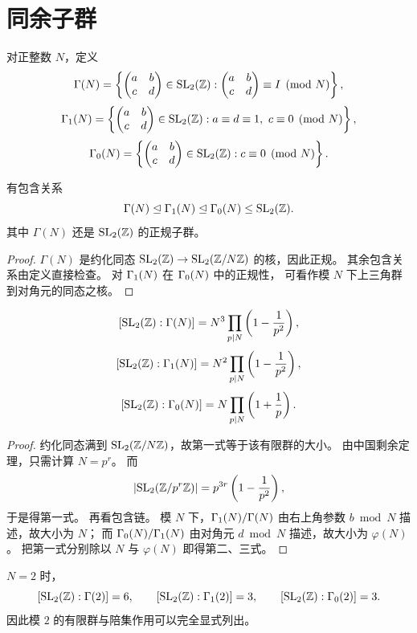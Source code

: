 \section{同余子群}
\begin{definition}
对正整数 $N$，定义
\[
\Gamma(N)=\left\{\begin{pmatrix} a&b\\c&d \end{pmatrix}\in\mathrm{SL}_2(\mathbb{Z}):
\begin{pmatrix} a&b\\c&d \end{pmatrix}\equiv I\pmod N\right\},
\]
\[
\Gamma_1(N)=\left\{\begin{pmatrix} a&b\\c&d \end{pmatrix}\in\mathrm{SL}_2(\mathbb{Z}):a\equiv d\equiv1,\ c\equiv0\pmod N\right\},
\]
\[
\Gamma_0(N)=\left\{\begin{pmatrix} a&b\\c&d \end{pmatrix}\in\mathrm{SL}_2(\mathbb{Z}):c\equiv0\pmod N\right\}.
\]
\end{definition}
\begin{proposition}
有包含关系
\[
\Gamma(N)\trianglelefteq \Gamma_1(N)\trianglelefteq \Gamma_0(N)\le \mathrm{SL}_2(\mathbb{Z}).
\]
其中 $\Gamma(N)$ 还是 $\mathrm{SL}_2(\mathbb{Z})$ 的正规子群。
\end{proposition}
\begin{proof}
$\Gamma(N)$ 是约化同态 $\mathrm{SL}_2(\mathbb{Z})\to \mathrm{SL}_2(\mathbb{Z}/N\mathbb{Z})$ 的核，因此正规。
其余包含关系由定义直接检查。
对 $\Gamma_1(N)$ 在 $\Gamma_0(N)$ 中的正规性，
可看作模 $N$ 下上三角群到对角元的同态之核。
\end{proof}
\begin{theorem}[指标公式]
\[
[\mathrm{SL}_2(\mathbb{Z}):\Gamma(N)]=N^3\prod_{p\mid N}\left(1-\frac1{p^2}\right),
\]
\[
[\mathrm{SL}_2(\mathbb{Z}):\Gamma_1(N)]=N^2\prod_{p\mid N}\left(1-\frac1{p^2}\right),
\]
\[
[\mathrm{SL}_2(\mathbb{Z}):\Gamma_0(N)]=N\prod_{p\mid N}\left(1+\frac1p\right).
\]
\end{theorem}
\begin{proof}
约化同态满到 $\mathrm{SL}_2(\mathbb{Z}/N\mathbb{Z})$，故第一式等于该有限群的大小。
由中国剩余定理，只需计算 $N=p^r$。
而
\[
|\mathrm{SL}_2(\mathbb{Z}/p^r\mathbb{Z})|=p^{3r}\left(1-\frac1{p^2}\right),
\]
于是得第一式。
再看包含链。
模 $N$ 下，$\Gamma_1(N)/\Gamma(N)$ 由右上角参数 $b\bmod N$ 描述，故大小为 $N$；
而 $\Gamma_0(N)/\Gamma_1(N)$ 由对角元 $d\bmod N$ 描述，故大小为 $\varphi(N)$。
把第一式分别除以 $N$ 与 $\varphi(N)$ 即得第二、三式。
\end{proof}
\begin{example}
$N=2$ 时，
\[
[\mathrm{SL}_2(\mathbb{Z}):\Gamma(2)]=6,
\qquad
[\mathrm{SL}_2(\mathbb{Z}):\Gamma_1(2)]=3,
\qquad
[\mathrm{SL}_2(\mathbb{Z}):\Gamma_0(2)]=3.
\]
因此模 $2$ 的有限群与陪集作用可以完全显式列出。
\end{example}
